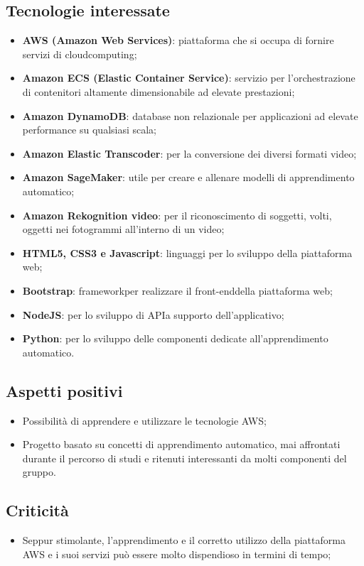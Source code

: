 \subsection{Tecnologie interessate}
\begin{itemize}
	\item \textbf{AWS (Amazon Web Services)}: piattaforma che si occupa di fornire servizi di cloud\glo computing;
	\item \textbf{Amazon ECS (Elastic Container Service)}: servizio per l'orchestrazione di contenitori altamente dimensionabile ad elevate	prestazioni;
	\item \textbf{Amazon DynamoDB}:  database non relazionale per applicazioni ad elevate performance su qualsiasi scala;
	\item \textbf{Amazon Elastic Transcoder}: per la conversione dei diversi formati video;
	\item \textbf{Amazon SageMaker}: utile per creare e allenare modelli di apprendimento automatico\glos;
	\item \textbf{Amazon Rekognition video}: per il riconoscimento di soggetti, volti, oggetti nei fotogrammi all'interno di un video;
	\item \textbf{HTML5, CSS3 e Javascript}: linguaggi per lo sviluppo della piattaforma web;
	\item \textbf{Bootstrap}: framework\glo per realizzare il front-end\glo della piattaforma web;
	\item \textbf{NodeJS}: per lo sviluppo di API\glo a supporto dell'applicativo;
	\item \textbf{Python}: per lo sviluppo delle componenti dedicate all'apprendimento automatico\glos.
\end{itemize}

\subsection{Aspetti positivi}
\begin{itemize}
	\item Possibilità di apprendere e utilizzare le tecnologie AWS;
	\item Progetto basato su concetti di apprendimento automatico\glos, mai affrontati durante il percorso di studi e ritenuti interessanti da molti componenti del gruppo.
\end{itemize}

\subsection{Criticità}
\begin{itemize}
	\item Seppur stimolante, l'apprendimento e il corretto utilizzo della piattaforma AWS e i suoi servizi può essere molto dispendioso in termini di tempo;
	
\end{itemize}

